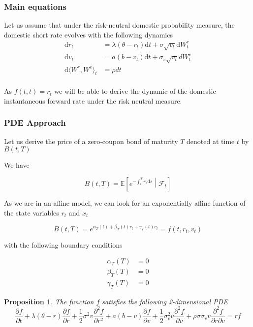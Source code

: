 \documentclass{article}
\newtheorem{proposition}[theorem]{Proposition}
\begin{document}
\subsubsection{Main equations}
Let us assume that under the risk-neutral domestic probability measure, the domestic short rate evolves with the following dynamics
\begin{equation}
\begin{aligned}
	\mathrm{d}r_t &= \lambda (\theta - r_t) \mathrm{d}t + \sigma \sqrt{v_t} \mathrm{d}W_t^r\\
	\mathrm{d}v_t &= a (b- v_t) \mathrm{d}t + \sigma_v \sqrt{v_t} dW_t^v\\
	\mathrm{d}\langle W^r, W^v \rangle_t &= \rho dt\\
\end{aligned}
\end{equation}

\noindent As $f(t,t) = r_t$ we will be able to derive the dynamic of the domestic instantaneous forward rate under the risk neutral measure.
\subsubsection{PDE Approach}
Let us derive the price of a zero-coupon bond of maturity $T$ denoted at time $t$ by $B(t,T)$

\noindent We have

\begin{equation*}
	B(t,T) = \mathbb{E}\left[e^{-\int_t^T r_s \mathrm{d}s}\middle|\mathcal{F}_t\right]
\end{equation*}

\noindent As we are in an affine model, we can look for an exponentially affine function of the state variables $r_t$ and $x_t$

\begin{equation}
	B(t,T) = e^{\alpha_T(t) + \beta_T(t) r_t + \gamma_T(t) v_t} = f(t, r_t, v_t)
\end{equation}

\noindent with the following boundary conditions

\begin{equation}
\begin{aligned}
	\alpha_T(T) &= 0\\
	\beta_T(T) &= 0\\
	\gamma_T(T) &= 0
\end{aligned}
\end{equation}

\begin{proposition}
	The function $f$ satisfies the following 2-dimensional PDE
	\begin{equation}
		\frac{\partial f}{\partial t} + \lambda(\theta - r) \frac{\partial f}{\partial r} + \frac{1}{2} \sigma^2 v \frac{\partial^2 f}{\partial r^2} + a (b-v) \frac{\partial f}{\partial v} + \frac{1}{2} \sigma_v^2 v \frac{\partial^2 f}{\partial v} + \rho \sigma \sigma_v v \frac{\partial^2 f}{\partial r \partial v} = rf
	\end{equation}
\end{proposition}
\end{document}
